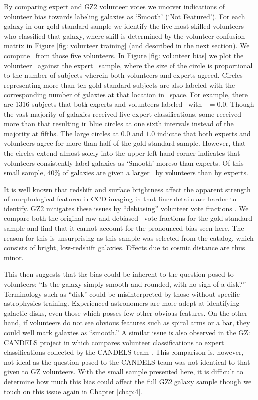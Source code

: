 By comparing expert and GZ2 volunteer votes we uncover indications of volunteer bias towards labeling galaxies as `Smooth' (`Not Featured'). For each galaxy in our gold standard sample we identify the five most skilled volunteers who classified that galaxy, where skill is determined by the volunteer confusion matrix in Figure \ref{fig: volunteer training} (and described in the next section). We compute \fsmooth~from those five volunteers. In Figure \ref{fig: volunteer bias} we plot the volunteer \fsmooth~against the expert \fsmooth~sample, where the size of the circle is proportional to the number of subjects wherein both volunteers and experts agreed. Circles representing more than ten gold standard subjects are also labeled with the corresponding number of galaxies at that location in \fsmooth~space. For example, there are 1316 subjects that both experts and volunteers labeled \feat~with \fsmooth~$ = 0.0$. Though the vast majority of galaxies received five expert classifications, some received more than that resulting in blue circles at one sixth intervals instead of the majority at fifths. The large circles at $0.0$ and $1.0$ indicate that both experts and volunteers agree for more than half of the gold standard sample. However, that the circles extend almost solely into the upper left hand corner indicates that volunteers consistently label galaxies as `Smooth' moreso than experts. Of this small sample, 40\% of galaxies are given a larger \fsmooth~by volunteers than by experts. 

It is well known that redshift and surface brightness affect the apparent strength of morphological features in CCD imaging in that finer details are harder to identify. GZ2 mitigates these issues by ``debiasing'' volunteer vote fractions \citep{Willett2013}. We compare both the original raw and debiased \fsmooth~vote fractions for the gold standard sample and find that it cannot account for the pronounced bias seen here. The reason for this is unsurprising as this sample was selected from the \cite{NairAbraham2010} catalog, which consists of bright, low-redshift galaxies. Effects due to cosmic distance are thus minor. 

This then suggests that the bias could be inherent to the question posed to volunteers: ``Is the galaxy simply smooth and rounded, with no sign of a disk?'' Terminology such as ``disk'' could be misinterpreted by those without specific astrophysics training. Experienced astronomers are more adept at identifying galactic disks, even those which posses few other obvious features. On the other hand, if volunteers do not see obvious features such as spiral arms or a bar, they could well mark galaxies as ``smooth.''  A similar issue is also observed in the GZ: CANDELS project in which \cite{Simmons2017} compares volunteer classifications to expert classifications collected by the CANDELS team \citep{Kartaltepe2015}. This comparison is, however, not ideal as the question posed to the CANDELS team was not identical to that given to GZ volunteers. With the small sample presented here, it is difficult to determine how much this bias could affect the full GZ2 galaxy sample though we touch on this issue again in Chapter \ref{chap:4}. 



